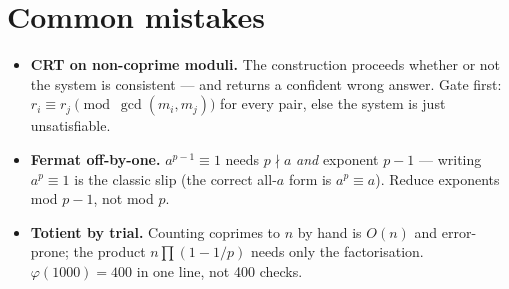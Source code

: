 \section{Common mistakes}
\begin{itemize}
\item \textbf{CRT on non-coprime moduli.} The construction proceeds
whether or not the system is consistent --- and returns a confident wrong
answer. Gate first: $r_i \equiv r_j \pmod{\gcd(m_i, m_j)}$ for every
pair, else the system is just unsatisfiable.
\item \textbf{Fermat off-by-one.} $a^{p-1} \equiv 1$ needs $p \nmid a$
\emph{and} exponent $p-1$ --- writing $a^p \equiv 1$ is the classic slip
(the correct all-$a$ form is $a^p \equiv a$). Reduce exponents mod
$p-1$, not mod $p$.
\item \textbf{Totient by trial.} Counting coprimes to $n$ by hand is
$O(n)$ and error-prone; the product $n\prod(1-1/p)$ needs only the
factorisation. $\varphi(1000) = 400$ in one line, not 400 checks.
\end{itemize}

